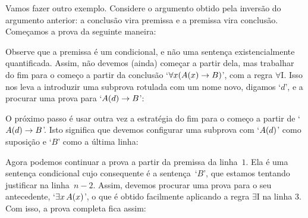  
\begin{fitchproof}
	\open
	\open
	\close
	\close
\end{fitchproof}
Vamos fazer outro exemplo. Considere o argumento obtido pela inversão do argumento anterior: a conclusão vira premissa e a premissa vira conclusão. Começamos a prova da seguinte maneira:
\begin{fitchproof}
	\ellipsesline
\end{fitchproof}
Observe que a premissa é um condicional, e não uma sentença  existencialmente quantificada.
Assim, não devemos (ainda) começar a partir  dela, mas trabalhar do fim para o começo a partir da conclusão `$\forall x(\mathord{A}(x) \rightarrow B)$', com a regra $\forall$I. Isso nos leva a introduzir uma subprova rotulada com um nome novo, digamos `$d$', e a procurar uma prova para `$\mathord{A}(d) \rightarrow B$':
\begin{fitchproof}
	\open
		\ellipsesline
	\close
\end{fitchproof}
O próximo passo é usar outra vez a estratégia do fim para o começo a partir de  `$\mathord{A}(d) \rightarrow B$'.  Isto significa que devemos configurar uma subprova  com  `$\mathord{A}(d)$' como suposição  e `$B$' como a última linha:  
 
\begin{fitchproof}
	\open
		\open
			\ellipsesline
		\close
	\close
\end{fitchproof}
Agora podemos continuar a prova a partir da premissa da linha~$1$.
Ela é uma sentença condicional cujo consequente é a sentença~`$B$', que estamos tentando justificar na linha~$n-2$. Assim, devemos procurar uma prova para o seu antecedente, `$\exists x\,\mathord{A}(x)$', o que é obtido facilmente aplicando a regra $\exists$I na linha $3$.
Com isso, a prova completa fica assim:
\begin{fitchproof}
	\open
		\open
		\close
	\close
\end{fitchproof}

